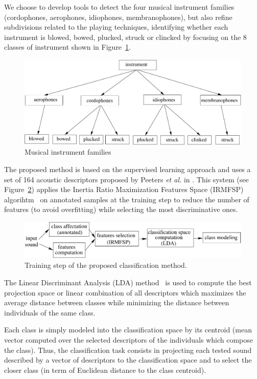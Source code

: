 \documentclass{sig-alternate}
\begin{document}
We choose to develop tools to detect the four musical instrument families (cordophones, aerophones, idiophones, membranophones), but also refine subdivisions related to the playing techniques, identifying whether each instrument is blowed, bowed, plucked, struck or clincked by focusing on the 8 classes of instrument shown in Figure~\ref{fig:instruments}.

\begin{figure}[htb]
  \centering
  \includegraphics[width=0.9\linewidth]{img/taxonomie_diadems.pdf}
  \caption{Musical instrument families}
  \label{fig:instruments}
\end{figure}

The proposed method is based on the supervised learning approach and uses a set of 164 acoustic descriptors 
proposed by Peeters \textit{et al.} in \cite{timbre_toolbox}.
This system (see Figure~\ref{fig:inst_classif_method}) applies the Inertia Ratio Maximization Features Space (IRMFSP) algorihtm~\cite{aes_irmfsp} 
on annotated samples at the training step to reduce the number of features (to avoid overfitting) while selecting the most discriminative ones. %

\begin{figure}[htb]
 \centering
 \includegraphics[width=0.9\linewidth]{img/method}
 \caption{Training step of the proposed classification method.}
 \label{fig:inst_classif_method}
\end{figure}

The Linear Discriminant Analysis (LDA) method~\cite{lda_book} is used to compute the best projection space 
or linear combination of all descriptors which maximizes the average distance between classes while minimizing the 
distance between individuals of the same class.

Each class is simply modeled into the classification space by its centroid (mean vector computed over the selected descriptors of the individuals which compose the class).
Thus, the classification task consists in projecting each tested sound described by a vector of descriptors
to the classification space and to select the closer class (in term of Euclidean distance to the class centroid). 
\end{document}
